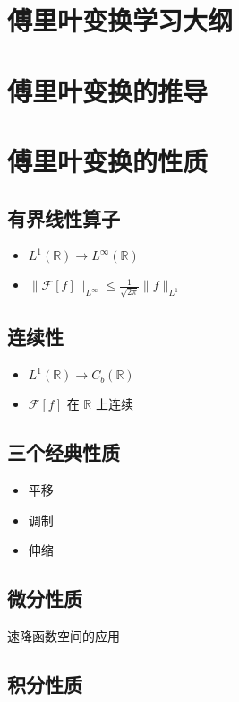 \documentclass[12pt,a4paper]{article}
\begin{document}
	
	\section*{傅里叶变换学习大纲}
	
	\section{傅里叶变换的推导}
	
	\section{傅里叶变换的性质}
	\subsection{有界线性算子}
	\begin{itemize}
		\item \(L^1(\mathbb{R}) \to L^\infty(\mathbb{R})\)
		\item \(\|\mathcal{F}[f]\|_{L^\infty} \leq \frac{1}{\sqrt{2\pi}} \|f\|_{L^1}\)
	\end{itemize}
	
	\subsection{连续性}
	\begin{itemize}
		\item \(L^1(\mathbb{R}) \to C_b(\mathbb{R})\)
		\item \(\mathcal{F}[f]\) 在 \(\mathbb{R}\) 上连续
	\end{itemize}
	
	\subsection{三个经典性质}
	\begin{itemize}
		\item 平移
		\item 调制
		\item 伸缩
	\end{itemize}
	
	\subsection{微分性质}

		速降函数空间的应用

	
	\subsection{积分性质}
\end{document}
